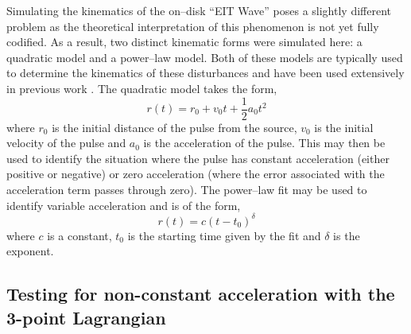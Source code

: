 \documentclass[structabstract]{aa}
\begin{document}
Simulating the kinematics of the on--disk ``EIT Wave'' poses a slightly different problem as the theoretical interpretation of this phenomenon is not yet fully codified. As a result, two distinct kinematic forms were simulated here: a quadratic model and a power--law model. Both of these models are typically used to determine the kinematics of these disturbances and have been used extensively in previous work \citep[e.g.,][]{Long:2008,Veronig:2008,Warmuth:2004,Muhr:2011}. The quadratic model takes the form,
\begin{equation}
r(t) = r_0 + v_0 t + \frac{1}{2}a_0 t^2
\end{equation}
where $r_0$ is the initial distance of the pulse from the source, $v_0$ is the initial velocity of the pulse and $a_0$ is the acceleration of the pulse. This may then be used to identify the situation where the pulse has constant acceleration (either positive or negative) or zero acceleration (where the error associated with the acceleration term passes through zero). The power--law fit may be used to identify variable acceleration and is of the form,
\begin{equation}
r(t) = c(t - t_0)^{\delta}
\end{equation}
where $c$ is a constant, $t_0$ is the starting time given by the fit and $\delta$ is the exponent.


\subsection{Testing for non-constant acceleration with the 3-point Lagrangian}
\label{subsect:test_lagrange}
\end{document}
